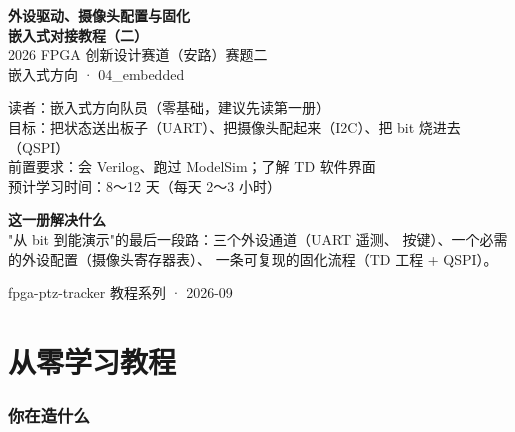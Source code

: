 \documentclass[11pt]{ctexart}
\begin{document}
\begin{titlepage}
\centering
\vspace*{2.2cm}
{\color{deep}\Huge\bfseries 外设驱动、摄像头配置与固化}\\[6pt]
{\color{deep}\Large\bfseries 嵌入式对接教程（二）}\\[14pt]
{\large 2026 FPGA 创新设计赛道（安路）赛题二}\\[6pt]
{\large 嵌入式方向 · 04\_embedded}\\[20pt]

\begin{tcolorbox}[enhanced, colback=codebg, colframe=accent, boxrule=0.8pt,
  arc=2mm, width=12.5cm, left=4mm, right=4mm, top=3mm, bottom=3mm]
\centering
{\small 读者：嵌入式方向队员（零基础，建议先读第一册）\\
目标：把状态送出板子（UART）、把摄像头配起来（I2C）、把 bit 烧进去（QSPI）\\
前置要求：会 Verilog、跑过 ModelSim；了解 TD 软件界面\\
预计学习时间：8～12 天（每天 2～3 小时）}
\end{tcolorbox}

\vspace{8mm}
\begin{tcolorbox}[enhanced, colback=tipbg, colframe=tipline, boxrule=0.5pt,
  arc=2mm, width=12.5cm, left=4mm, right=4mm, top=2mm, bottom=2mm]
\centering
{\small\color{deep} \textbf{这一册解决什么}\\
"从 bit 到能演示"的最后一段路：三个外设通道（UART 遥测、
按键）、一个必需的外设配置（摄像头寄存器表）、
一条可复现的固化流程（TD 工程 + QSPI）。}
\end{tcolorbox}

\vfill
{\small\color{black!50} fpga-ptz-tracker 教程系列 · 2026-09}
\end{titlepage}

\tableofcontents
\newpage

\part{从零学习教程}

\section{你在造什么}
\end{document}
